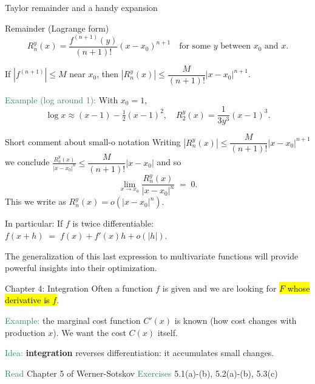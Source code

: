 \documentclass[11pt]{beamer}
\begin{document}
\begin{frame}{Taylor remainder and a handy expansion}
\begin{alertblock}{Remainder (Lagrange form)}
\[
R_n^y(x)=\frac{f^{(n+1)}(y)}{(n+1)!}(x-x_0)^{n+1}\quad\text{for some }y\text{ between }x_0\text{ and }x.
\]
\end{alertblock}
If $|f^{(n+1)}|\le M$ near $x_0$, then $|R_n^y(x)|\le \dfrac{M}{(n+1)!}|x-x_0|^{n+1}$.
\bigskip

\textcolor{SeaGreen}{Example (log around 1):} With $x_0=1$,
\[
\log x \approx (x-1)-\tfrac12(x-1)^2,\quad 
R_2^y(x)=\frac{1}{3y^3}(x-1)^3.
\]
\end{frame}



\begin{frame}{Short comment about small-o notation}
	Writing $|R_n^y(x)|\le \dfrac{M}{(n+1)!}|x-x_0|^{n+1}$ we conclude $\tfrac{R^y_n(x)}{|x-x_0|^{n}}\leq \dfrac{M}{(n+1)!}|x-x_0|$ and so
	$$
	\lim_{x\to x_0} \frac{R^y_n(x)}{|x-x_0|^{n}}\;=\;0.
	$$
	This we write as $ R^y_n(x)=o(|x-x_0|^{n})$.\\[5mm]
	
\begin{alertblock}{In particular: If $f$ is twice differentiable:}
	$f(x+h)\;=\;f(x)+f'(x)h + o(|h|)$.
\end{alertblock}
The generalization of this last expression to multivariate functions will provide powerful insights into their optimization. 
\end{frame}



\begin{frame}{Chapter 4: Integration}
Often a function $f$ is given and we are looking for \hl{$F$ whose derivative is $f$}.
\bigskip

\textcolor{SeaGreen}{Example:} the marginal cost function $C'(x)$ is known (how cost changes with production $x$). We want the cost $C(x)$ itself.
\bigskip

\textcolor{SeaGreen}{Idea:} \textbf{integration} reverses differentiation: it accumulates small changes.
\bigskip

\textcolor{SeaGreen}{Read} Chapter 5 of Werner-Sotskov \quad
\textcolor{SeaGreen}{Exercises} 5.1(a)-(b), 5.2(a)-(b), 5.3(c)
\end{frame}
\end{document}
